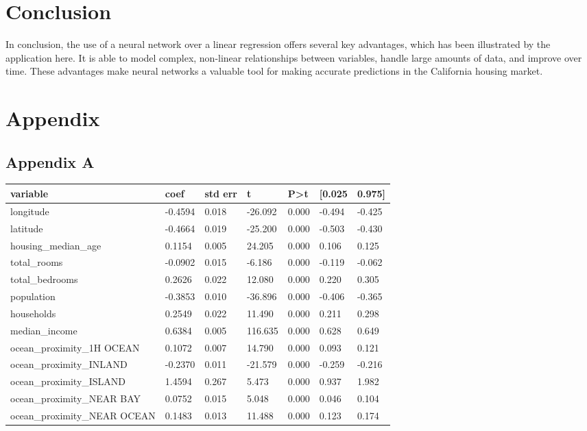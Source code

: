 \documentclass[11pt]{article}
\begin{document}
\section{Conclusion}
In conclusion, the use of a neural network over a linear regression offers several key advantages, which has been illustrated by the application here. It is able to model complex, non-linear relationships between variables, handle large amounts of data, and improve over time. These advantages make neural networks a valuable tool for making accurate predictions in the California housing market.


\section{Appendix}
\subsection{Appendix A}
 \begin{table}[H]
\centering
\begin{tabular}{|l|l|l|l|l|l|l|} 
\hline
\textbf{variable} & \textbf{coef} & \textbf{std err} & \textbf{t} & \textbf{P\textgreater{}\textbar{}t\textbar{}} & \textbf{[0.025} & \textbf{0.975]} \\ 
\hline
longitude & -0.4594 & 0.018 & -26.092 & 0.000 & -0.494 & -0.425 \\ 
\hline
latitude & -0.4664 & 0.019 & -25.200 & 0.000 & -0.503 & -0.430 \\ 
\hline
housing\_median\_age & 0.1154 & 0.005 & 24.205 & 0.000 & 0.106 & 0.125 \\ 
\hline
total\_rooms & -0.0902 & 0.015 & -6.186 & 0.000 & -0.119 & -0.062 \\ 
\hline
total\_bedrooms & 0.2626 & 0.022 & 12.080 & 0.000 & 0.220 & 0.305 \\ 
\hline
population & -0.3853 & 0.010 & -36.896 & 0.000 & -0.406 & -0.365 \\ 
\hline
households & 0.2549 & 0.022 & 11.490 & 0.000 & 0.211 & 0.298 \\ 
\hline
median\_income & 0.6384 & 0.005 & 116.635 & 0.000 & 0.628 & 0.649 \\ 
\hline
ocean\_proximity\_1H OCEAN & 0.1072 & 0.007 & 14.790 & 0.000 & 0.093 & 0.121 \\ 
\hline
ocean\_proximity\_INLAND & -0.2370 & 0.011 & -21.579 & 0.000 & -0.259 & -0.216 \\ 
\hline
ocean\_proximity\_ISLAND & 1.4594 & 0.267 & 5.473 & 0.000 & 0.937 & 1.982 \\ 
\hline
ocean\_proximity\_NEAR BAY & 0.0752 & 0.015 & 5.048 & 0.000 & 0.046 & 0.104 \\ 
\hline
ocean\_proximity\_NEAR OCEAN & 0.1483 & 0.013 & 11.488 & 0.000 & 0.123 & 0.174 \\
\hline
\end{tabular}
\end{table}





\end{document}
